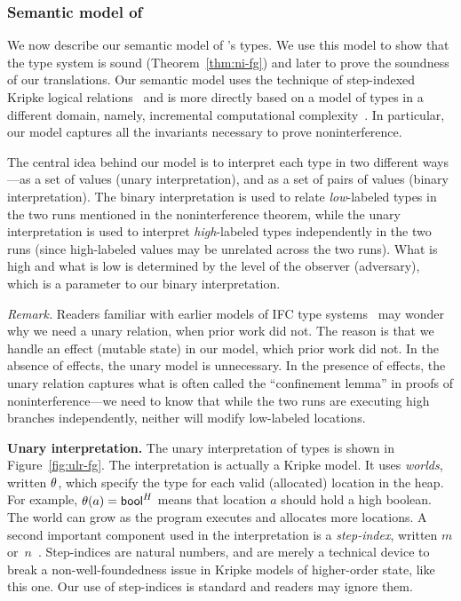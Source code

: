 \subsubsection{Semantic model of {\fg}}\label{sec:fg-sem}

We now describe our semantic model of {\fg}'s types. We use this model
to show that the type system is sound (Theorem~\ref{thm:ni-fg}) and
later to prove the soundness of our translations. Our semantic model
uses the technique of step-indexed Kripke logical
relations~\cite{DBLP:conf/popl/AhmedDR09} and is more directly based
on a model of types in a different domain, namely, incremental
computational complexity~\cite{DBLP:conf/icfp/CicekP016}. In
particular, our model captures all the invariants necessary to prove
noninterference.

The central idea behind our model is to interpret each type in two
different ways---as a set of values (unary interpretation), and as a
set of pairs of values (binary interpretation). The binary
interpretation is used to relate \emph{low}-labeled types in the two
runs mentioned in the noninterference theorem, while the unary
interpretation is used to interpret \emph{high}-labeled types
independently in the two runs (since high-labeled values may be
unrelated across the two runs). What is high and what is low is
determined by the level of the observer (adversary), which is a
parameter to our binary interpretation.

\textit{Remark.} Readers familiar with earlier models of IFC type
systems~\cite{popl98-SLAM,popl99-DCC,esop99-PER-IFC} may wonder why we
need a unary relation, when prior work did not. The reason is that we
handle an effect (mutable state) in our model, which prior work did
not. In the absence of effects, the unary model is unnecessary. In the
presence of effects, the unary relation captures what is often called
the ``confinement lemma'' in proofs of noninterference---we need to
know that while the two runs are executing high branches
independently, neither will modify low-labeled locations.

\medskip
\noindent \textbf{Unary interpretation.}
%
The unary interpretation of types is shown in
Figure~\ref{fig:ulr-fg}. The interpretation is actually a Kripke
model. It uses \emph{worlds}, written $\theta$, which specify the
type for each valid (allocated) location in the heap. For example,
$\theta(a) = \mathsf{bool}^H$ means that location $a$ should hold a high
boolean. The world can grow as the program executes and allocates more
locations. A second important component used in the interpretation is
a \emph{step-index}, written $m$
or~$n$~\cite{esop06-SILR}. Step-indices are natural numbers, and are
merely a technical device to break a non-well-foundedness issue in
Kripke models of higher-order state, like this one. Our use of
step-indices is standard and readers may ignore them.

